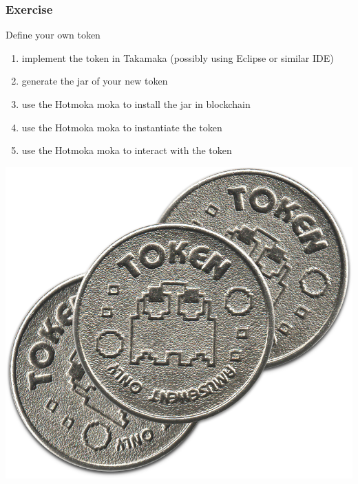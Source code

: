 \documentclass[11pt]{beamer}  %
\begin{document}
\begin{frame}\frametitle{Exercise}

  \begin{greenbox}{Define your own token}
  \begin{enumerate}
  \item implement the token in Takamaka (possibly using Eclipse or similar IDE)
  \item generate the jar of your new token
  \item use the Hotmoka moka to install the jar in blockchain
  \item use the Hotmoka moka to instantiate the token
  \item use the Hotmoka moka to interact with the token
  \end{enumerate}
  \end{greenbox}

  \bigskip

  \begin{center}
    \includegraphics[scale=0.12,clip=false]{pictures/tokens.png}
  \end{center}

\end{frame}
\end{document}
